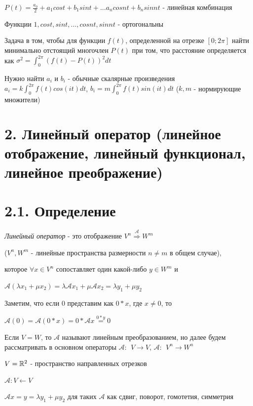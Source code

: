 \documentclass[12pt]{article}
\begin{document}
    $P(t) = \frac{a_0}{2} + a_1 cos t + b_1 sin t + \dots a_n cos nt + b_n sin nt$ - линейная комбинация

    Функции ${1, cos t, sin t, \dots, cos nt, sin nt}$ - ортогональны

    Задача в том, чтобы для функции $f(t)$, определенной на отрезке $[0;2\pi]$ найти минимально отстоящий многочлен $P(t)$ при том,
    что расстояние определяется как $\displaystyle \sigma^2 = \int_0^{2\pi} (f(t) - P(t))^2 dt$

    Нужно найти $a_i$ и $b_i$ - обычные скалярные произведения $\displaystyle a_i = k \int_0^{2\pi} f(t) cos(it) dt$, $\displaystyle b_i = m \int_0^{2\pi} f(t) sin(it) dt$ ($k, m$ - нормирующие множители)

    \clearpage

    \section{2. Линейный оператор (линейное отображение, линейный функционал, линейное преображение)}

    \section{2.1. Определение}

    \textit{Линейный оператор} - это отображение $V^n \stackrel{\mathcal{A}}{\Longrightarrow} W^m$

    ($V^n, W^m$ - линейные пространства размерности $n \neq m$ в общем случае),

    которое $\forall x \in V^n$ сопоставляет один какой-либо $y \in W^m$ и

    $\mathcal{A} (\lambda x_1 + \mu x_2) = \lambda \mathcal{A} x_1 + \mu \mathcal{A} x_2 = \lambda y_1 + \mu y_2$

    \Nota Заметим, что если 0 представим как $0 * x$, где $x \neq 0$, то

    $\mathcal{A}(0) = \mathcal{A}(0 * x) = 0 * \mathcal{A}x \stackrel{0 * y}{=} 0$

    \Nota Если $V = W$, то $\mathcal{A}$ называют линейным преобразованием, но далее будем рассматривать в основном операторы $\mathcal{A}: \ \ V \rightarrow V$, $\mathcal{A}: \ \ V^n \rightarrow W^n$



     $V = \mathbb{R}^2$ - пространство направленных отрезков

    $\mathcal{A}: V \leftarrow V$

    $\mathcal{A}x = y = \lambda y_1 + \mu y_2$ для таких $\mathcal{A}$ как сдвиг, поворот, гомотетия, симметрия
\end{document}
